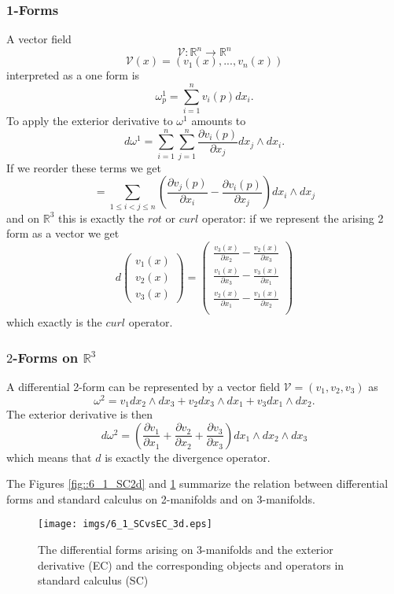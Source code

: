 \subsubsection{1-Forms}
A vector field 
\[\mathcal V : \mathbb R^n \to \mathbb R^n\]
\[\mathcal V(x) = (v_1(x),...,v_n(x))\]
 interpreted as a one form is
\[\omega^1_p = \sum_{i = 1}^n v_i(p) d x_i .\]
To apply the exterior derivative to $\omega^1$ amounts to
\[d\omega^1 = \sum_{i=1}^n \sum_{j = 1} ^n \frac{\partial v_i(p)}{\partial x_j} dx_j \wedge d x_i.\]
If we reorder these terms we get
\[= \sum_{1\leq i < j \leq n } (\frac{\partial v_j(p)}{\partial x_i} - \frac{\partial v_i(p)}{\partial x_j}) dx_i \wedge d x_j\]
and on $\mathbb R^3$ this is exactly the $rot$ or $curl$ operator: if we represent the arising 2 form as a vector we get
\[d \begin{pmatrix}
v_1(x) \\ v_2(x) \\ v_3(x)
\end{pmatrix} = \begin{pmatrix}
\frac{v_3(x)}{\partial x_2} -\frac{v_2(x)}{\partial x_3}\\
\frac{v_1(x)}{\partial x_3} -\frac{v_3(x)}{\partial x_1}\\
\frac{v_2(x)}{\partial x_1} -\frac{v_1(x)}{\partial x_2}\\
\end{pmatrix}\]
which exactly is the $curl$ operator.

\subsubsection{$2$-Forms on $\mathbb R^3$}
A differential 2-form can be represented by a vector field $\mathcal V = (v_1,v_2,v_3)$ as
\[\omega^2 = v_1 dx_2 \wedge dx_3 + v_2 dx_3 \wedge dx_1 + v_3 dx_1 \wedge dx_2.\]
The exterior derivative is then
\[d \omega^2 = (\frac{\partial v_1}{\partial x_1} + \frac{\partial v_2}{\partial x_2} + \frac{\partial v_3}{\partial x_3})dx_1\wedge dx_2 \wedge dx_3\]
which means that $d$ is exactly the divergence operator.

The Figures \ref{fig::6_1_SC2d} and  \ref{fig::6_1_SC3d} summarize the relation between differential forms and standard calculus on 2-manifolds and  on 3-manifolds.


\begin{figure}
\begin{center}
\texttt{[image: imgs/6\_1\_SCvsEC\_3d.eps]}
\end{center}
\caption{The differential forms arising on 3-manifolds and the exterior derivative (EC) and the corresponding objects and operators in standard calculus (SC)}
\label{fig::6_1_SC3d}
\end{figure}


